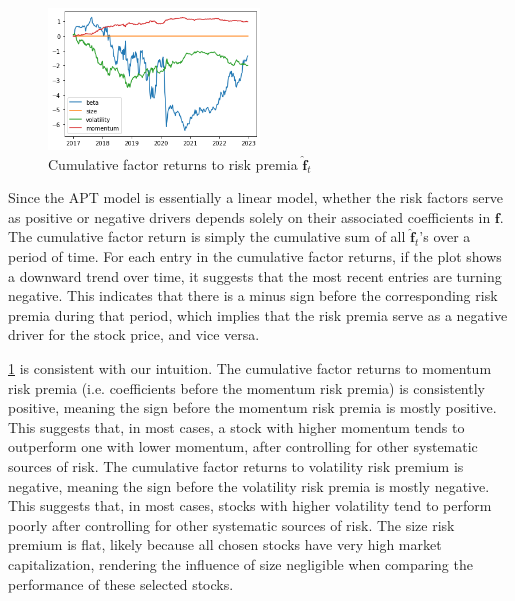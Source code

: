 \documentclass[13pt]{article}
\theoremstyle{definition}
\theoremstyle{remark}
\begin{document}
\begin{figure}[!htp]
    \centering
    \includegraphics[width=0.5\textwidth]{apt.png}
    \caption{Cumulative factor returns to risk premia $\hat{\boldsymbol{f}}_t$}
    \label{fig:apt}
\end{figure}

Since the APT model is essentially a linear model, whether the risk factors serve as positive or negative drivers depends solely on their associated coefficients in $\bm{f}$. The cumulative factor return is simply the cumulative sum of all $\hat{\boldsymbol{f}}_t$'s over a period of time. For each entry in the cumulative factor returns, if the plot shows a downward trend over time, it suggests that the most recent entries are turning negative. This indicates that there is a minus sign before the corresponding risk premia during that period, which implies that the risk premia serve as a negative driver for the stock price, and vice versa.

\cref{fig:apt} is consistent with our intuition. The cumulative factor returns to momentum risk premia (i.e. coefficients before the momentum risk premia) is consistently positive, meaning the sign before the momentum risk premia is mostly positive. This suggests that, in most cases, a stock with higher momentum tends to outperform one with lower momentum, after controlling for other systematic sources of risk. The cumulative factor returns to volatility risk premium is negative, meaning the sign before the volatility risk premia is mostly negative. This suggests that, in most cases, stocks with higher volatility tend to perform poorly after controlling for other systematic sources of risk. The size risk premium is flat, likely because all chosen stocks have very high market capitalization, rendering the influence of size negligible when comparing the performance of these selected stocks.
\end{document}
